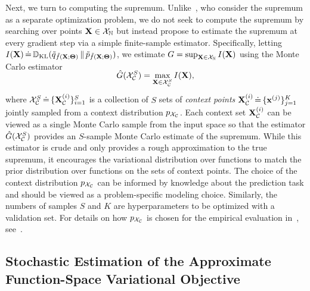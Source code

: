 Next, we turn to computing the supremum.
Unlike~\citet{sun2019fbnn}, who consider the supremum as a separate optimization problem, we do not seek to compute the supremum by searching over points $\mathbf X \in \mathcal{X}_{\mathbb{N}}$ but instead propose to estimate the supremum at every gradient step via a simple finite-sample estimator.
Specifically, letting $I(\mathbf X) \,\dot{=}\, \mathbb{D}_\textrm{KL}(\smash{\tilde{q}}_{\smash{\tilde{f}}(\mathbf X ; \boldsymbol{\Theta})} \,\|\, \smash{\tilde{p}}_{\smash{\tilde{f}}(\mathbf X ; \boldsymbol{\Theta})})$, we estimate $G = \sup_{\mathbf X \in \mathcal{X}_{\mathbb{N}}} I(\mathbf X)$ using the Monte Carlo estimator
%
\begin{align}
\SwapAboveDisplaySkip
\label{eq:kl_estimator_max}
    \hat{G}(\calX_{\calC}^{S})
    =
    \max_{ \bX \in \calX_{\calC}^{S}} I(\bX) ,
\end{align}%
where \mbox{$\mathcal{X}_{\mathcal{C}}^{S} \,\dot{=}\, \{ \mathbf{X}_{\mathcal{C}}^{(i)} \}_{i=1}^S$} is a collection of $S$ sets of \textit{context points} \mbox{$\mathbf{X}_{\mathcal{C}}^{(i)} \,\dot{=}\, \{ \mathbf x^{(j)} \}_{j=1}^{K}$} jointly sampled from a context distribution $p_{\mathcal{X}_{\mathcal{C}}}$.
Each context set $\mathbf{X}_{\mathcal{C}}^{(i)}$ can be viewed as a single Monte Carlo sample from the input space so that the estimator $\hat{G}(\mathcal{X}_{\mathcal{C}}^{S})$ provides an $S$-sample Monte Carlo estimate of the supremum.
%
While this estimator is crude and only provides a rough approximation to the true supremum, it encourages the variational distribution over functions to match the prior distribution over functions on the sets of context points.
%
The choice of the context distribution $p_{\mathcal{X}_{\mathcal{C}}}$ can be informed by knowledge about the prediction task and should be viewed as a problem-specific modeling choice.
Similarly, the numbers of samples $S$ and $K$ are hyperparameters to be optimized with a validation set.
For details on how $p_{\mathcal{X}_{\mathcal{C}}}$ is chosen for the empirical evaluation in~, see~.
%


\subsection{Stochastic Estimation of the Approximate Function-Space Variational Objective}

